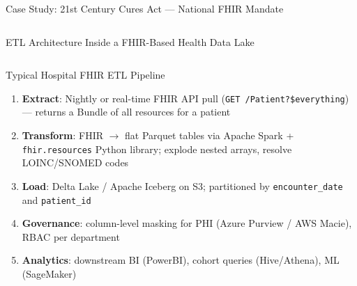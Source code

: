 \documentclass[aspectratio=169,10pt]{beamer}
\begin{document}
\begin{frame}{Case Study: 21st Century Cures Act — National FHIR Mandate}
\begin{columns}[T]
\begin{center}
      \end{center}
  \end{columns}
\end{frame}

\begin{frame}{ETL Architecture Inside a FHIR-Based Health Data Lake}
  \begin{columns}[T]
      \begin{block}{Typical Hospital FHIR ETL Pipeline}
        \begin{enumerate}
          \item \textbf{Extract}: Nightly or real-time FHIR API pull
                (\texttt{GET /Patient?\$everything})
                — returns a Bundle of all resources for a patient
          \item \textbf{Transform}: FHIR $\to$ flat Parquet tables
                via Apache Spark + \texttt{fhir.resources} Python library;
                explode nested arrays, resolve LOINC/SNOMED codes
          \item \textbf{Load}: Delta Lake / Apache Iceberg on S3;
                partitioned by \texttt{encounter\_date} and \texttt{patient\_id}
          \item \textbf{Governance}: column-level masking for PHI
                (Azure Purview / AWS Macie), RBAC per department
          \item \textbf{Analytics}: downstream BI (PowerBI),
                cohort queries (Hive/Athena), ML (SageMaker)
        \end{enumerate}
      \end{block}


\end{columns}
\end{frame}
\end{document}
